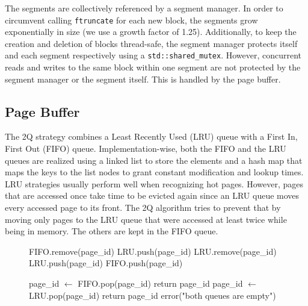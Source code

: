The segments are collectively referenced by a segment manager. In order to circumvent calling \texttt{ftruncate} for each new block, the segments grow exponentially in size (we use a growth factor of 1.25). Additionally, to keep the creation and deletion of blocks thread-safe, the segment manager protects itself and each segment respectively using a \texttt{std::shared\_mutex}. However, concurrent reads and writes to the same block within one segment are not protected by the segment manager or the segment itself. This is handled by the page buffer.

\subsection{Page Buffer}\label{5.1.2}
The 2Q strategy combines a Least Recently Used (LRU) queue with a First In, First Out (FIFO) queue. Implementation-wise, both the FIFO and the LRU queues are realized using a linked list to store the elements and a hash map that maps the keys to the list nodes to grant constant modification and lookup times. LRU strategies usually perform well when recognizing hot pages. However, pages that are accessed once take time to be evicted again since an LRU queue moves every accessed page to its front. The 2Q algorithm tries to prevent that by moving only pages to the LRU queue that were accessed at least twice while being in memory. The others are kept in the FIFO queue.

\begin{figure}[h]
	\centering
	\begin{minipage}[t]{.48\textwidth}
		\label{fig:update_queue}
		\vspace*{5mm}
		\begin{algorithmic}[1]
			\State FIFO.remove(page\_id)
			\State LRU.push(page\_id)
			\State LRU.remove(page\_id)
			\State LRU.push(page\_id)
			\Else
			\State FIFO.push(page\_id)
			\EndIf
			\EndFunction
		\end{algorithmic}
	\end{minipage}%
	\begin{minipage}[t]{.52\textwidth}
		\label{fig:find_in_queue}
		\vspace*{5mm}
		\begin{algorithmic}[1]
			\State page\_id $\leftarrow$ FIFO.pop(page\_id)
			\State return page\_id
			\State page\_id $\leftarrow$ LRU.pop(page\_id)
			\State return page\_id
			\EndIf
			\State error("both queues are empty")
			\EndFunction
		\end{algorithmic}
	\end{minipage}
\end{figure}

